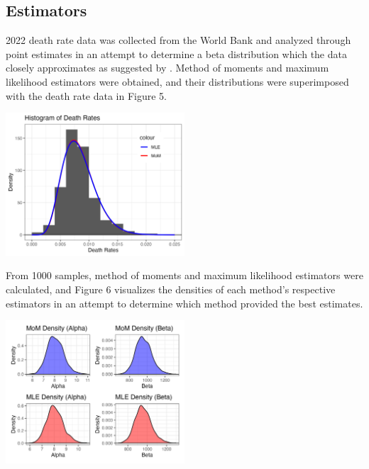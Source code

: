 \documentclass{article}\usepackage[]{graphicx}\usepackage[]{xcolor}
\newenvironment{Figure}
  {\par\medskip\noindent\minipage{\linewidth}}
  {\endminipage\par\medskip}
\begin{document}
\begin{multicols}{2}
\section{Estimators}

2022 death rate data was collected from the World Bank and analyzed through point estimates in an attempt to determine a beta distribution which the data closely approximates as suggested by \cite{fatih}. Method of moments and maximum likelihood estimators were obtained, and their distributions were superimposed with the death rate data in Figure 5.

\begin{Figure}
\begin{center}
  \includegraphics[width=0.5\textwidth]{task7.png}
\end{center} 
\end{Figure}

From 1000 samples, method of moments and maximum likelihood estimators were calculated, and Figure 6 visualizes the densities of each method's respective estimators in an attempt to determine which method provided the best estimates. 

\begin{Figure}
\begin{center}
  \includegraphics[width=0.5\textwidth]{task8.png}
\end{center} 
\end{Figure}


\end{multicols}
\end{document}
